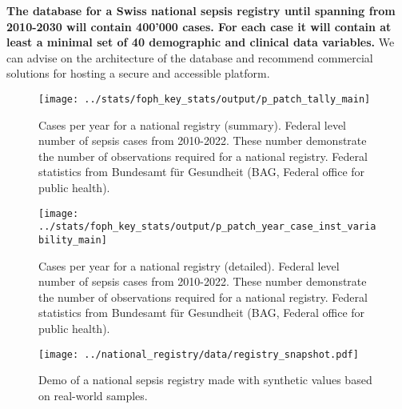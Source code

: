 \textbf{The database for a Swiss national sepsis registry until spanning from 2010-2030 will contain 400'000 cases. 
For each case it will contain at least a minimal set of 40 demographic and clinical data variables.}
We can advise on the architecture of the database and recommend commercial solutions for hosting a secure and accessible platform.

\begin{figure}[h] \hspace*{0cm} 
\begin{center}
	\texttt{[image: ../stats/foph\_key\_stats/output/p\_patch\_tally\_main]}
	\caption{Cases per year for a national registry (summary). Federal level number of sepsis cases from 2010-2022. These number demonstrate the number of observations required for a national registry. Federal statistics from Bundesamt für Gesundheit (BAG, Federal office for public health).}
	\label{fig:national_registry1}
\end{center}
\end{figure}

\begin{figure}[h] \hspace*{0cm} 
\begin{center}
	\texttt{[image: ../stats/foph\_key\_stats/output/p\_patch\_year\_case\_inst\_variability\_main]}
	\caption{Cases per year for a national registry (detailed). Federal level number of sepsis cases from 2010-2022. These number demonstrate the number of observations required for a national registry. Federal statistics from Bundesamt für Gesundheit (BAG, Federal office for public health).}
	\label{fig:national_registry2}
\end{center}
\end{figure}

\begin{figure}[h] \hspace*{0cm} 
\begin{center}
	\texttt{[image: ../national\_registry/data/registry\_snapshot.pdf]}
	\caption{Demo of a national sepsis registry made with synthetic values based on real-world samples.}
	\label{fig:national_registry_snapshot}
\end{center}
\end{figure}

